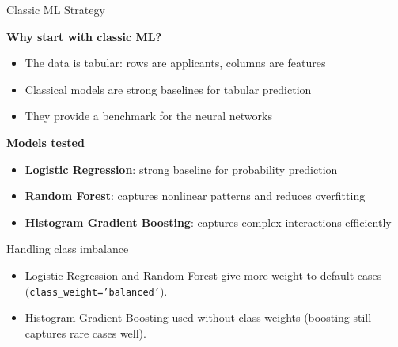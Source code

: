 \documentclass[aspectratio=169,11pt]{beamer}
\begin{document}
\begin{frame}{Classic ML Strategy}

\scriptsize

\textbf{Why start with classic ML?}
\begin{itemize}
    \item The data is tabular: rows are applicants, columns are features
    \item Classical models are strong baselines for tabular prediction
    \item They provide a benchmark for the neural networks
\end{itemize}

\vspace{0.2cm}

\textbf{Models tested}
\begin{itemize}
    \item \textbf{Logistic Regression}: strong baseline for probability prediction
    \item \textbf{Random Forest}: captures nonlinear patterns and reduces overfitting
    \item \textbf{Histogram Gradient Boosting}: captures complex interactions efficiently
\end{itemize}

\vspace{0.2cm}

\begin{block}{Handling class imbalance}
\begin{itemize}
    \item Logistic Regression and Random Forest give more weight to default cases (\texttt{class\_weight='balanced'}).
    \item Histogram Gradient Boosting used without class weights (boosting still captures rare cases well).
\end{itemize}
\end{block}

\end{frame}
\end{document}
